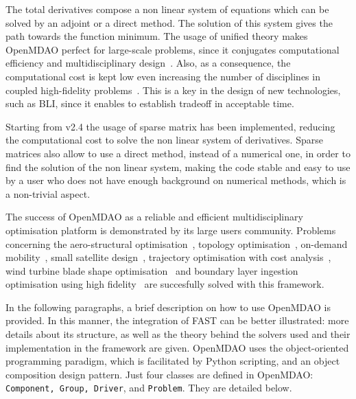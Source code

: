 The total derivatives compose a non linear system of equations which can be solved by an adjoint or a direct method. 
The solution of this system gives the path towards the function minimum. 
The usage of unified theory makes OpenMDAO perfect for large-scale problems, since it conjugates computational efficiency and multidisciplinary design~\cite{bib:hwang_omdao}. 
Also, as a consequence, the computational cost is kept low even increasing the number of disciplines in coupled high-fidelity problems~\cite{bib:martins_2005}. 
This is a key in the design of new technologies, such as BLI, since it enables to establish tradeoff in acceptable time. 

Starting from v2.4 the usage of sparse matrix has been implemented, reducing the computational cost to solve the non linear system of derivatives. 
Sparse matrices also allow to use a direct method, instead of a numerical one, in order to find the solution of the non linear system, making the code stable and easy to use by a user who does not have enough background on numerical methods, which is a non-trivial aspect.

The success of OpenMDAO as a reliable and efficient multidisciplinary optimisation platform is demonstrated by its large users community.
Problems concerning the aero-structural optimisation~\cite{bib:jasa_openaerostruct}, topology optimisation~\cite{bib:jasa_topology}, on-demand mobility~\cite{bib:hwang_x57}, small satellite design~\cite{bib:hwang_satellite}, trajectory optimisation with cost analysis~\cite{bib:hwang_mission_opt}, wind turbine blade shape optimisation~\cite{bib:barlas} and boundary layer ingestion optimisation using high fidelity~\cite{bib:gray} are succesfully solved with this framework.

In the following paragraphs, a brief description on how to use OpenMDAO is provided. 
In this manner, the integration of FAST can be better illustrated: more details about its structure, as well as the theory behind the solvers used and their implementation in the framework are given. 
OpenMDAO uses the object-oriented programming paradigm, which is facilitated by Python scripting, and an object composition design pattern. 
Just four classes are defined in OpenMDAO: \texttt{Component, Group, Driver}, and \texttt{Problem}.
They are detailed below. 

